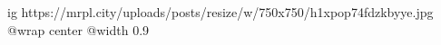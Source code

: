  
 
 
 
 

\ifcmt
  ig https://mrpl.city/uploads/posts/resize/w/750x750/h1xpop74fdzkbyye.jpg
  @wrap center
  @width 0.9
\fi
